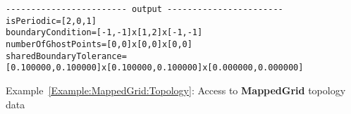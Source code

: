 \documentclass{article}
\begin{document}
{\small
{}
\begin{verbatim}
------------------------ output -----------------------
isPeriodic=[2,0,1]
boundaryCondition=[-1,-1]x[1,2]x[-1,-1]
numberOfGhostPoints=[0,0]x[0,0]x[0,0]
sharedBoundaryTolerance=[0.100000,0.100000]x[0.100000,0.100000]x[0.000000,0.000000]
\end{verbatim}
}
{\center Example~\ref{Example:MappedGrid:Topology}: Access to \textbf{MappedGrid} topology data\label{Example:MappedGrid:Topology}}

\end{document}
